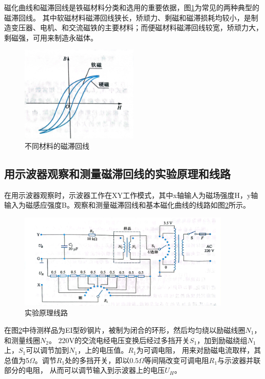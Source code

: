 \documentclass{ctexart}
\begin{document}
  磁化曲线和磁滞回线是铁磁材料分类和选用的重要依据，图\ref{butongcailiaoqvxian}为常见的两种典型的磁滞回线。
  其中软磁材料磁滞回线狭长，矫顽力、剩磁和磁滞损耗均较小，是制造变压器、电机、和交流磁铁的主要材料；而便磁材料磁滞回线较宽，矫顽力大，剩磁强，可用来制造永磁体。

  \begin{figure}[H]\label{butongcailiaoqvxian}
    \centering
    \includegraphics[width=0.5\textwidth,height=0.3\textheight]{butongcailiaoqvxian.jpg}
    \caption{不同材料的磁滞回线}
  \end{figure}


  \subsection{用示波器观察和测量磁滞回线的实验原理和线路}
  在用示波器观察时，示波器工作在XY工作模式，其中x轴输人为磁场强度H，y轴输入为磁感应强度B。观察和测量磁滞回线和基本磁化曲线的线路如图\ref{shiyanyuanliluxian}所示。

  \begin{figure}[H]\label{shiyanyuanliluxian}
    \centering
    \includegraphics[width=0.9\textwidth,height=0.3\textheight]{shiyanyuanxianlu.jpg}
    \caption{实验原理线路}
  \end{figure}

  在图\ref{shiyanyuanliluxian}中待测样品为EI型砂钢片，被制为闭合的环形，然后均匀绕以励磁线圈$N_{1}$，和测量线圈$N_{2}$。
  220V的交流电经电压变换后经过多挡开关$S_{1}$，加到励磁绕组$N_{1}$上，$S_{1}$可以调节加到$N_{1}$，上的电压值。$R_{1}$为可调电阻，
  用来对励磁电流取样，其总值为5$\Omega$。调节$R_{1}$处的多挡开关，即以$0.5\Omega$等间隔改变可调电阻$R_{1}$与示波器并联部分的电阻，
  从而可以调节输入到示波器上的电压$U_{H}$。
\end{document}
